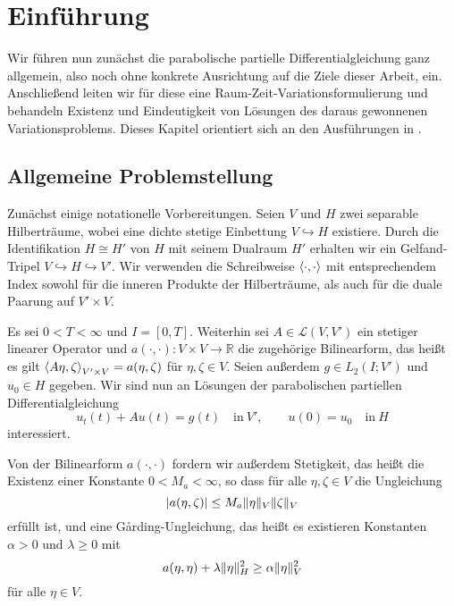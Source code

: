 
\chapter{Einführung} %
\label{cha:einfuehrung}

Wir führen nun zunächst die parabolische partielle Differentialgleichung ganz allgemein, also noch ohne konkrete Ausrichtung auf die Ziele dieser Arbeit, ein.
Anschließend leiten wir für diese eine Raum-Zeit-Variationsformulierung und behandeln Existenz und Eindeutigkeit von Lösungen des daraus gewonnenen Variationsproblems.
Dieses Kapitel orientiert sich an den Ausführungen in \cite{Schwab:2009ec, Urban:2014kg}.

\section{Allgemeine Problemstellung} %
\label{sec:allgemeine_problemstellung}

Zunächst einige notationelle Vorbereitungen.
Seien $V$ und $H$ zwei separable Hilberträume, wobei eine dichte stetige Einbettung $V \hookrightarrow H$ existiere.
Durch die Identifikation $H \cong H'$ von $H$ mit seinem Dualraum $H'$ erhalten wir ein Gelfand-Tripel $V \hookrightarrow H \hookrightarrow V'$.
Wir verwenden die Schreibweise $\left\langle\cdot,\cdot\right\rangle$ mit entsprechendem Index sowohl für die inneren Produkte der Hilberträume, als auch für die duale Paarung auf $V' \times V$.

Es sei $0 < T < \infty$ und $I = [0, T]$.
Weiterhin sei $A \in \mathcal L(V, V')$ ein stetiger linearer Operator und $a(\cdot, \cdot) \colon V \times V \to \mathbb{R}$ die zugehörige Bilinearform, das heißt es gilt $\left\langle A \eta,\zeta\right\rangle_{V' \times V} = a(\eta, \zeta)$ für $\eta, \zeta \in V$.
Seien außerdem $g \in L_{2}(I; V')$ und $u_{0} \in H$ gegeben.
Wir sind nun an Lösungen der parabolischen partiellen Differentialgleichung
\begin{equation}
    \label{eq:allgemeine_parabolische_pde}
    u_{t}(t) + A u(t) = g(t) \quad \text{in}~V',
    \qquad
    u(0) = u_{0} \quad \text{in}~H
\end{equation}
interessiert.

Von der Bilinearform $a(\cdot, \cdot)$ fordern wir außerdem Stetigkeit, das heißt die Existenz einer Konstante $0 < M_{a} < \infty$, so dass für alle $\eta, \zeta \in V$ die Ungleichung
\begin{equation}
    \label{eq:allgemeine_parabolische_pde:bf_stetig}
    \lvert a(\eta, \zeta)\rvert \leq M_{a} \lVert\eta\rVert_{V} \lVert\zeta\rVert_{V}
\end{equation}
erfüllt ist, und eine G\aa rding-Ungleichung, das heißt es existieren Konstanten $\alpha > 0$ und $\lambda \geq 0$ mit
\begin{equation}
    \label{eq:allgemeine_parabolische_pde:bf_garding}
    a(\eta, \eta) + \lambda \lVert\eta\rVert_{H}^{2} \geq \alpha \lVert\eta\rVert_{V}^{2}
\end{equation}
für alle $\eta \in V$.

